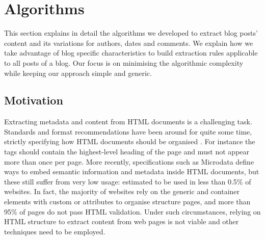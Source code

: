 \section{Algorithms}
\label{algorithms}

This section explains in detail the algorithms we developed to extract blog posts' content and its variations for authors, dates and comments.
We explain how we take advantage of blog specific characteristics to build extraction rules applicable to all posts of a blog.
Our focus is on minimising the algorithmic complexity while keeping our approach simple and generic.


\subsection{Motivation}
\label{motivation}

Extracting metadata and content from HTML documents is a challenging task. Standards and format recommendations have been around for quite some time, strictly specifying how HTML documents should be organised \cite{w3c2013}. For instance the  tags should contain the highest-level heading of the page and must not appear more than once per page\cite{w3c2002}. More recently, specifications such as Microdata\cite{whatwg2013} define ways to embed semantic information and metadata inside HTML documents, but these still suffer from very low usage: estimated to be used in less than 0.5\%\cite{andrewrogers2013} of websites. In fact, the majority of websites rely on the generic  and  container elements with custom  or  attributes to organise structure pages\cite{brianwilson2008}, and more than 95\% of pages do not pass HTML validation\cite{brianwilson2008-a}. Under such circumstances, relying on HTML structure to extract content from web pages is not viable and other techniques need to be employed.




